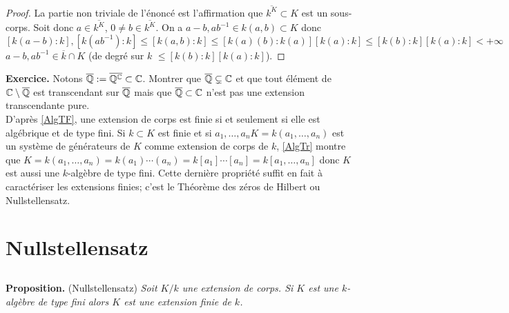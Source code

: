 \begin{proof} La partie non triviale de l'énoncé est l'affirmation que $\overline{k^K}\subset K$ est un sous-corps. Soit donc $a \in \overline{k^K}$, $0\not=b\in \overline{k^K}$. On a $a-b, ab^{-1}\in k(a,b)\subset K$ donc
$$[k(a-b):k], [k(ab^{-1}):k]\leq [k(a,b):k]\leq [k(a)(b):k(a)][k(a):k]\leq [k(b):k][k(a):k]<+\infty$$
 \ie{} $a-b, ab^{-1}\in \overline{k}\cap K$ (de degré sur $k$ $\leq  [k(b):k][k(a):k]$). \end{proof}

 \textbf{Exercice.} Notons $\overline{\mathbb{Q}}:=\overline{\mathbb{Q}^{\mathbb{C}}}\subset  \mathbb{C}$. Montrer que $\overline{\mathbb{Q}}\subsetneq \mathbb{C}$ et que tout élément de $\mathbb{C}\setminus \overline{\mathbb{Q}}$ est transcendant sur $\overline{\mathbb{Q}}$ mais que  $\overline{\mathbb{Q}}\subset  \mathbb{C}$ n'est pas une extension transcendante pure.\\

 D'après  \ref{AlgTF}, une extension de corps est finie si et seulement si elle est algébrique et  de type  fini. Si $k\subset K$ est finie  et   si $a_1,\dots, a_n$$K=k(a_1,\dots, a_n)$ est un système de générateurs de $K$ comme extension de corps de $k$, \ref{AlgTr} montre que  $K=k(a_1,\dots, a_n)=k(a_1)\cdots(a_n)=k[a_1]\cdots [a_n]=k[a_1,\dots, a_n]$ donc $K$ est aussi une $k$-algèbre de type fini. Cette dernière propriété suffit en fait  à caractériser les extensions finies; c'est le Théorème des zéros de Hilbert ou Nullstellensatz. \\

\section{Nullstellensatz}

\subsection{}\label{Hilbert1}\textbf{Proposition.} (Nullstellensatz) \textit{Soit $  K/k$ une extension de corps. Si $K$ est une $k$-algèbre de type fini alors $K$ est une extension finie de $k$.}

